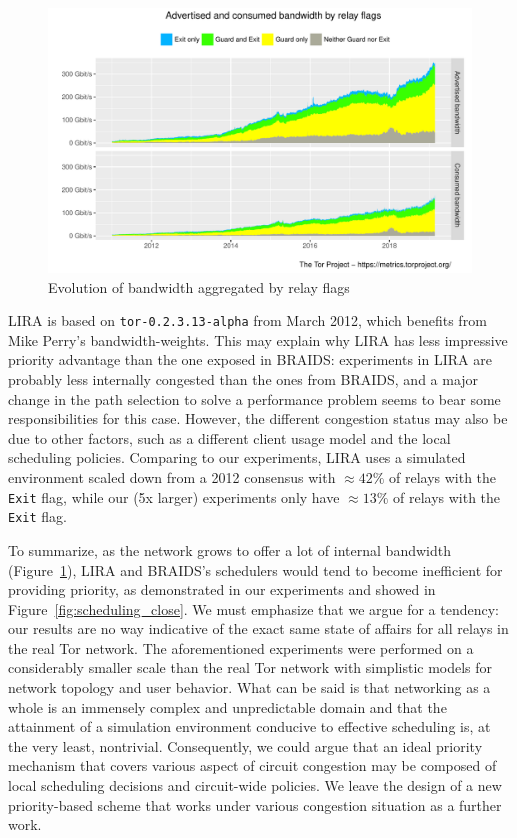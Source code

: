 \begin{figure}
  \includegraphics[scale=0.415]{images/bandwidth-flags-2011-01-01-2019-02-25.pdf}
  \caption{Evolution of bandwidth aggregated by relay flags} \label{fig:bw_inequalities}
\end{figure}

LIRA is based on \texttt{tor-0.2.3.13-alpha} from March 2012, which benefits
from Mike Perry's bandwidth-weights. This may explain why LIRA has less impressive priority advantage than the one exposed in BRAIDS: experiments in LIRA are probably less internally congested than the ones from BRAIDS, and a major change in the path selection to solve a performance problem seems to bear some responsibilities for this case. However, the different congestion status may also be due to other factors, such as a different client usage model and the local scheduling policies. Comparing to our experiments, LIRA uses a simulated environment scaled down from a 2012 consensus with $\approx 42\%$ of relays with the \texttt{Exit} flag, while our (5x larger) experiments only have $\approx 13\%$ of relays with the \texttt{Exit} flag. 
 
To summarize, as the network grows to offer a lot of internal bandwidth (Figure~\ref{fig:bw_inequalities}), LIRA and BRAIDS's schedulers would tend to become inefficient for providing priority, as demonstrated in our experiments and showed in Figure~\ref{fig:scheduling_close}. 
We must emphasize that we argue for a tendency: our results are no way indicative of the exact same state of affairs for all relays in the real Tor network. The aforementioned experiments
were performed on a considerably smaller scale than the real Tor network with simplistic models for
network topology and user behavior. What can be said is that networking as a
whole is an immensely complex and unpredictable domain and that the attainment
of a simulation environment conducive to effective scheduling is, at the very
least, nontrivial. Consequently, we could argue that an ideal priority mechanism that covers various
aspect of circuit congestion may be composed of local scheduling decisions and
circuit-wide policies. We leave the design of a new priority-based scheme that
works under various congestion situation as a further work.

